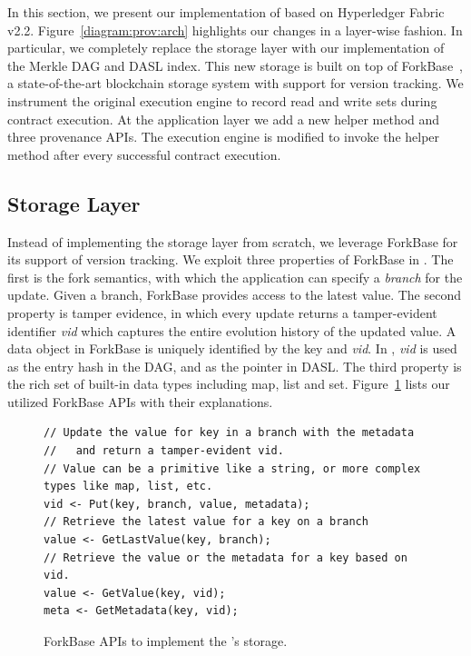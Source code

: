 In this section, we present our implementation of {\fs} based on Hyperledger Fabric v2.2. 
Figure~\ref{diagram:prov:arch} highlights our changes in a layer-wise fashion. 
In particular, we completely
replace the storage layer with our implementation of the Merkle DAG and DASL index. This new storage
is built on top of ForkBase~\cite{wang2018forkbase}, a state-of-the-art blockchain storage system
with support for version tracking.  We instrument the original execution engine to record read and write sets
during contract execution. At the application layer we add a new helper method and three provenance APIs. The
execution engine is modified to invoke the helper method after every successful contract execution.  


\subsection{Storage Layer}
Instead of implementing the storage layer from scratch, we leverage ForkBase for its support of version
tracking.  We exploit three properties of ForkBase in {\fs}. The first is the fork semantics, with which
the application can specify a \textit{branch} for the update. Given
a branch, ForkBase provides access to the latest value.  The second property is tamper evidence, in which
every update returns a tamper-evident identifier {\em vid} which captures the entire evolution history of the
updated value. A data object in ForkBase is uniquely identified by the key and {\em vid}. In {\fs}, {\em
vid} is used as the entry hash in the DAG, and as the pointer in DASL. The third property is the rich set of
built-in data types including map, list and set. 
Figure~\ref{code:prov:api} lists our utilized ForkBase APIs with their explanations. 

\begin{figure}
\centering
\footnotesize
\begin{verbatim}
// Update the value for key in a branch with the metadata 
//   and return a tamper-evident vid. 
// Value can be a primitive like a string, or more complex types like map, list, etc. 
vid <- Put(key, branch, value, metadata);
// Retrieve the latest value for a key on a branch
value <- GetLastValue(key, branch);
// Retrieve the value or the metadata for a key based on vid. 
value <- GetValue(key, vid);
meta <- GetMetadata(key, vid);
\end{verbatim}
\caption{ForkBase APIs to implement the {\fs}'s storage. }
\label{code:prov:api}
\end{figure}

